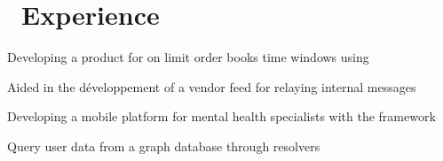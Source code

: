 \section{\faBriefcase \ Experience}

\hfill
\hfill
\begin{tightemize}
\item Developing a product for  on limit order books time windows using 
\item Aided in the développement of  a vendor feed for relaying internal messages
\end{tightemize}

\sectionsep 

\begin{tightemize}
\item Developing a mobile platform for mental health specialists with the  framework
\item Query user data from a  graph database through  resolvers
\end{tightemize}
